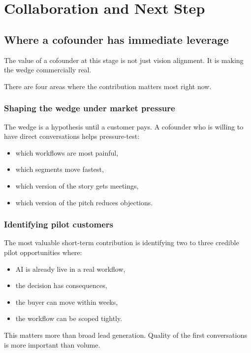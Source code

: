 \chapter{Collaboration and Next Step}

\section{Where a cofounder has immediate leverage}

The value of a cofounder at this stage is not just vision alignment.
It is making the wedge commercially real.

There are four areas where the contribution matters most right now.

\subsection{Shaping the wedge under market pressure}

The wedge is a hypothesis until a customer pays.
A cofounder who is willing to have direct conversations helps pressure-test:

\begin{itemize}
  \item which workflows are most painful,
  \item which segments move fastest,
  \item which version of the story gets meetings,
  \item which version of the pitch reduces objections.
\end{itemize}

\subsection{Identifying pilot customers}

The most valuable short-term contribution is identifying two to three credible pilot opportunities where:

\begin{itemize}
  \item AI is already live in a real workflow,
  \item the decision has consequences,
  \item the buyer can move within weeks,
  \item the workflow can be scoped tightly.
\end{itemize}

This matters more than broad lead generation.
Quality of the first conversations is more important than volume.

